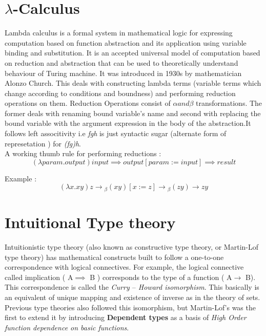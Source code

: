 \section{$\lambda$-Calculus}

Lambda calculus is a formal system in mathematical logic for expressing computation based on function abstraction and its application using variable binding and substitution. It is an accepted universal model of computation based on reduction and abstraction that can be used to theoretically understand behaviour of Turing machine. It was introduced in 1930s by mathematician Alonzo Church. This deals with constructing lambda terms (variable terms which change according to conditions and boundness) and performing reduction operations on them. Reduction Operations consist of $\alpha  and  \beta $ transformations. The former deals with renaming bound variable's name and second with replacing the bound variable with the argument expression in the body of the abstraction.It follows left associtivity i.e \textit{fgh} is just syntactic sugar (alternate form of represetation ) for \textit{(fg)h}.\\

A working thumb rule for performing reductions :
\[
 \boxed {(\lambda param . output)input \implies output [param := input] \implies result }
\]

Example : \[(\lambda x.xy)z \longrightarrow {}_\beta(xy)[x:=z] \longrightarrow {}_\beta (zy) \longrightarrow zy \]

 
\section{Intuitional Type theory} 

Intuitionistic type theory (also known as constructive type theory, or Martin-Lof type theory) has mathematical constructs  built to follow a one-to-one correspondence with logical connectives. For example, the logical connective called implication ( { A$\implies$ B} ) corresponds to the type of a function ( { A$\to$ B}). This correspondence is called the \textit{Curry $–$ Howard isomorphism}. This basically is an equivalent of unique mapping and existence of inverse as in the theory of sets. Previous type theories also followed this isomorphism, but Martin-Lof's was the first to extend it by introducing \textbf{Dependent types} as a basis of \textit{High Order function dependence on basic functions}.\\

